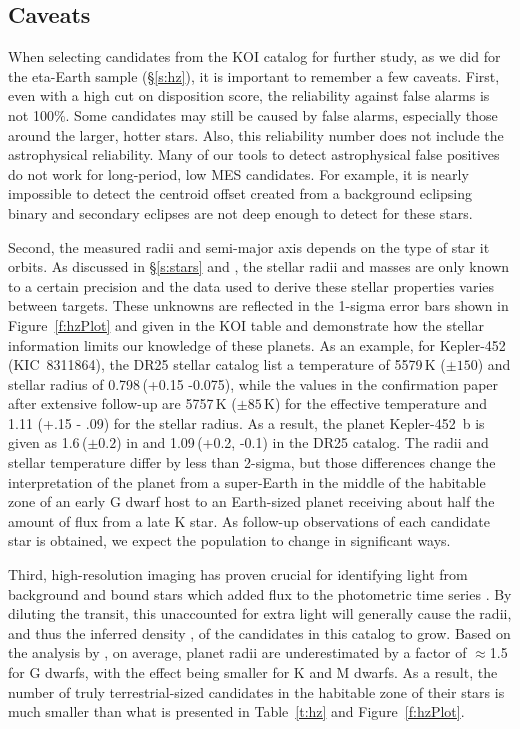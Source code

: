 \subsection{Caveats}
{\color{blue}
When selecting candidates from the KOI catalog for further study, as we did for the eta-Earth sample (\S\ref{s:hz}), it is important to remember a few caveats. First, even with a high cut on disposition score, the reliability against false alarms is not 100\%. Some candidates may still be caused by false alarms, especially those around the larger, hotter stars. Also, this reliability number does not include the astrophysical reliability. Many of our tools to detect astrophysical false positives do not work for long-period, low MES candidates. For example, it is nearly impossible to detect the centroid offset created from a background eclipsing binary and secondary eclipses are not deep enough to detect for these stars. 

Second, the measured radii and semi-major axis depends on the type of star it orbits.  As discussed in \S\ref{s:stars} and \citet{Mathur2017ApJS}, the stellar radii and masses are only known to a certain precision and the data used to derive these stellar properties varies between targets. These unknowns are reflected in the 1-sigma error bars shown in Figure~\ref{f:hzPlot} and given in the KOI table and demonstrate how the stellar information limits our knowledge of these planets.  As an example, for Kepler-452 (KIC~8311864), the DR25 stellar catalog list a temperature of 5579\,K ($\pm150$) and stellar radius of 0.798\,\rsun (+0.15 -0.075), while the values in the confirmation paper \citep{Jenkins2015} after extensive follow-up are 5757\,K ($\pm85$\,K) for the effective temperature and 1.11 (+.15 - .09) for the stellar radius.  As a result, the planet Kepler-452~b is given as 1.6\,\re ($\pm0.2$) in \citet{Jenkins2015} and 1.09\,\re (+0.2, -0.1) in the DR25 catalog. The radii and stellar temperature differ by less than 2-sigma, but those differences change the interpretation of the planet from a super-Earth in the middle of the habitable zone of an early G dwarf host to an Earth-sized planet receiving about half the amount of flux from a late K star.  As follow-up observations of each candidate star is obtained, we expect the population to change in significant ways.  

Third, high-resolution imaging has proven crucial for identifying light from background and bound stars which added flux to the \Kepler{} photometric time series \citep{Furlan2017}. By diluting the transit, this unaccounted for extra light will generally cause the radii, and thus the inferred density \citep[see][]{Furlan2017densities}, of the candidates in this catalog to grow. Based on the analysis by \citet{Ciardi2015}, on average, planet radii are underestimated by a factor of $\approx$1.5 for G dwarfs, with the effect being smaller for K and M dwarfs. As a result, the number of truly terrestrial-sized candidates in the habitable zone of their stars is much smaller than what is presented in Table~\ref{t:hz} and Figure~\ref{f:hzPlot}.



}





